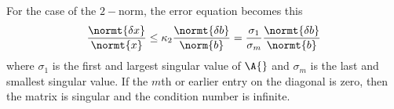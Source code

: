 For the case of the $2-$norm, the error equation becomes this
\begin{equation}
  \begin{split}
    \frac{ \normt{\delta x}}{\normt{x}} \le \kappa_{2} \frac{\normt{\delta b}}{\norm{b}} = \frac{\sigma_{1}}{\sigma_{m}}\frac{\normt{\delta b}}{\normt{b}}
  \end{split}
\end{equation}
where $\sigma_{1}$ is the first and largest singular value of $\A{}$ and $\sigma_{m}$ is the last and smallest singular value. If the $m$th or earlier entry on the diagonal is zero, then the matrix is singular and the condition number is infinite.

\endinput